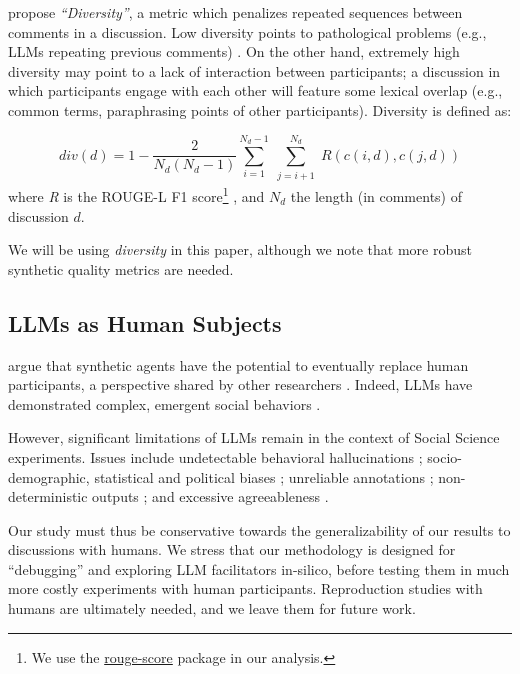 \citet{ulmer2024} propose \emph{``Diversity''}, a metric which penalizes repeated sequences between comments in a discussion. Low diversity points to pathological problems (e.g., \acp{LLM} repeating previous comments) \cite{ulmer2024}. On the other hand, extremely high diversity may point to a lack of interaction between participants; a discussion in which participants engage with each other will feature some lexical overlap (e.g., common terms, paraphrasing points of other participants). Diversity is defined as:

\small
\begin{equation}
	\label{eq:variety}
	\textit{div}(d) = 1 - \frac{2}{N_d(N_d-1)}
	\sum_{i=1}^{N_d-1} \sum_{\substack{j=i+1}}^{N_d} R(c(i,d), c(j,d))
\end{equation}
\normalsize
\noindent where \textit{R} is the ROUGE-L F1 score\footnote{We use the \href{https://pypi.org/project/rouge-score}{rouge-score} package in our analysis.} \cite{lin-2004-rouge}, and $N_d$ the length (in comments) of discussion $d$.

 We will be using \emph{diversity} in this paper, although we note that more robust synthetic quality metrics are needed.


\subsection{LLMs as Human Subjects}
\label{ssec:related:human-llm}

\citet{grossman_2023} argue that synthetic agents have the potential to eventually replace human participants, a perspective shared by other researchers \cite{tornberg_2023, argyle2023}. Indeed, \acp{LLM} have demonstrated complex, emergent social behaviors \cite{Park2023GenerativeAI, demarzo_2023, leng_2024, abdelnabi_negotiations, abramski_2023, hewitt2024predicting, park2024generativeagentsimulations1000}.

However, significant limitations of \acp{LLM} remain in the context of Social Science experiments. Issues include undetectable behavioral hallucinations \cite{rossi_2024}; socio-demographic, statistical and political biases \cite{anthis_2025,hewitt2024predicting,rossi_2024, Taubenfeld2024SystematicBI}; unreliable annotations \cite{jansen_2023,bisbee_2023,neumann_2025, Gligoric2024CanUL}; non-deterministic outputs \cite{atil_2025, bisbee_2023}; and excessive agreeableness \cite{Park2023GenerativeAI, anthis_2025, rossi_2024}.

Our study must thus be conservative towards the generalizability of our results to discussions with humans. We stress that our methodology is designed for “debugging” and exploring \ac{LLM} facilitators in-silico, before testing them in much more costly experiments with human participants. Reproduction studies with humans are ultimately needed, and we leave them for future work.